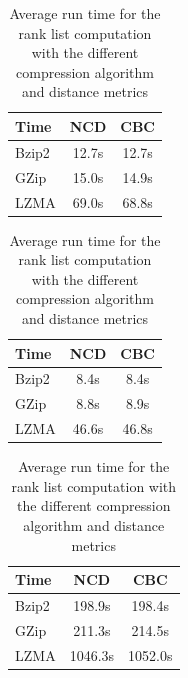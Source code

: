 \begin{table}
  \centering
  \caption{Average run time for the rank list computation with the different compression algorithm and distance metrics}
  \label{tab:compression_evaluation_times}

  \label{tab:compression_evaluation_time_oxquarry}
  \begin{tabular}{l c c}
    \toprule
    Time      & NCD   & CBC \\
    \midrule
    Bzip2     & 12.7s & 12.7s \\
    GZip      & 15.0s & 14.9s \\
    LZMA      & 69.0s & 68.8s \\
    \bottomrule
  \end{tabular}

  \label{tab:compression_evaluation_time_brunet}
  \begin{tabular}{l c c}
    \toprule
    Time      & NCD   & CBC \\
    \midrule
    Bzip2     & 8.4s & 8.4s \\
    GZip      & 8.8s & 8.9s \\
    LZMA      & 46.6s & 46.8s \\
    \bottomrule
  \end{tabular}

  \label{tab:compression_evaluation_time_st_jean}
  \begin{tabular}{l c c}
    \toprule
    Time      & NCD    & CBC \\
    \midrule
    Bzip2     & 198.9s  & 198.4s \\
    GZip      & 211.3s  & 214.5s \\
    LZMA      & 1046.3s & 1052.0s \\
    \bottomrule
  \end{tabular}
\end{table}
